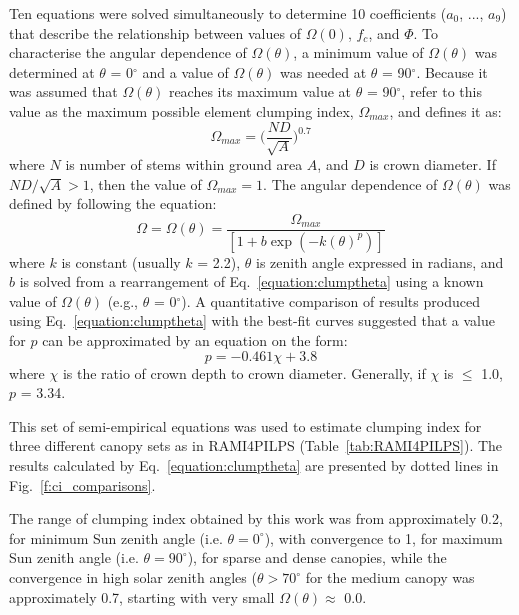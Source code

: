 Ten equations were solved simultaneously to determine 10 coefficients ($a_0$, ..., $a_9$) that describe the relationship between values of $\Omega(0)$, $f_c$, and $\Phi$. To characterise the angular dependence of $\Omega(\theta)$, a minimum value of $\Omega(\theta)$ was determined at $\theta$ = 0$^{\circ}$ and a value of $\Omega(\theta)$ was needed at $\theta$ = 90$^{\circ}$. Because it was assumed that $\Omega(\theta)$ reaches its maximum value at $\theta$ = 90$^{\circ}$, \citet{Kucharik1999} refer to this value as the maximum possible element clumping index, $\Omega_{max}$, and defines it as:
\begin{equation}
\Omega_{max} = \Big(\frac{ND}{\sqrt{A}}\Big)^{0.7}
\label{equation:clumpmax}
\end{equation}
\noindent where $N$ is number of stems within ground area $A$, and $D$ is crown diameter. If $ND/\sqrt{A} > 1$, then the value of $\Omega_{max} = 1$. The angular dependence of $\Omega(\theta)$ was defined by \citet{Kucharik1999} following the equation: 
\begin{equation}
\Omega = \Omega(\theta) = \frac{\Omega_{max}}{[1 + b\exp(-k(\theta)^p)]}
\label{equation:clumptheta}
\end{equation}
\noindent where $k$ is constant (usually $k$ = 2.2), $\theta$ is zenith angle expressed in radians, and $b$ is solved from a rearrangement of Eq.~\ref{equation:clumptheta} using a known value of $\Omega(\theta)$ (e.g., $\theta$ = 0$^{\circ}$). A quantitative comparison of results produced using Eq.~\ref{equation:clumptheta} with the best-fit curves suggested that a value for $p$ can be approximated by an equation on the form:
\begin{equation}
p = -0.461\chi + 3.8
\label{equation:pchi}
\end{equation}
\noindent where $\chi$ is the ratio of crown depth to crown diameter. Generally, if $\chi$ is $\leq$ 1.0, $p$ = 3.34. 

This set of semi-empirical equations was used to estimate clumping index for three different canopy sets as in RAMI4PILPS (Table~\ref{tab:RAMI4PILPS}). The results calculated by Eq.~\ref{equation:clumptheta} are presented by dotted lines in Fig.~\ref{f:ci_comparisons}.

The range of clumping index obtained by this work was from approximately 0.2, for minimum Sun zenith angle (i.e. $\theta = 0^{\circ}$), with convergence to 1, for maximum Sun zenith angle (i.e. $\theta = 90^{\circ}$), for sparse and dense canopies, while the convergence in high solar zenith angles ($\theta > 70^{\circ}$ for the medium canopy was approximately 0.7, starting with very small $\Omega(\theta) \approx$ 0.0.

